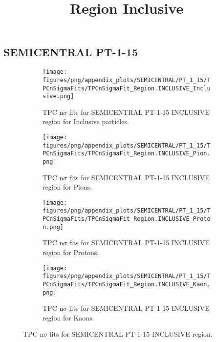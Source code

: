             \subsection{SEMICENTRAL PT-1-15}
            \begin{figure}[H]
                \title{Region Inclusive}
                \begin{subfigure}[b]{0.5\textwidth}
                    \centering
                    \texttt{[image: figures/png/appendix\_plots/SEMICENTRAL/PT\_1\_15/TPCnSigmaFits/TPCnSigmaFit\_Region.INCLUSIVE\_Inclusive.png]}
                    \caption{TPC n$\sigma$ fits for SEMICENTRAL PT-1-15 INCLUSIVE region for Inclusive particles.}
                    \label{fig:appendix_SEMICENTRAL_PT-1-15_INCLUSIVE_Inclusive}
                \end{subfigure}
                \begin{subfigure}[b]{0.5\textwidth}
                    \centering
                    \texttt{[image: figures/png/appendix\_plots/SEMICENTRAL/PT\_1\_15/TPCnSigmaFits/TPCnSigmaFit\_Region.INCLUSIVE\_Pion.png]}
                    \caption{TPC n$\sigma$ fits for SEMICENTRAL PT-1-15 INCLUSIVE region for Pions.}
                    \label{fig:appendix_SEMICENTRAL_PT-1-15_INCLUSIVE_Pion}
                \end{subfigure}
                \begin{subfigure}[b]{0.5\textwidth}
                    \centering
                    \texttt{[image: figures/png/appendix\_plots/SEMICENTRAL/PT\_1\_15/TPCnSigmaFits/TPCnSigmaFit\_Region.INCLUSIVE\_Proton.png]}
                    \caption{TPC n$\sigma$ fits for SEMICENTRAL PT-1-15 INCLUSIVE region for Protons.}
                    \label{fig:appendix_SEMICENTRAL_PT-1-15_INCLUSIVE_Proton}
                \end{subfigure}
                \begin{subfigure}[b]{0.5\textwidth}
                    \centering
                    \texttt{[image: figures/png/appendix\_plots/SEMICENTRAL/PT\_1\_15/TPCnSigmaFits/TPCnSigmaFit\_Region.INCLUSIVE\_Kaon.png]}
                    \caption{TPC n$\sigma$ fits for SEMICENTRAL PT-1-15 INCLUSIVE region for Kaons.}
                    \label{fig:appendix_SEMICENTRAL_PT-1-15_INCLUSIVE_Kaon}
                \end{subfigure}
                \caption{TPC n$\sigma$ fits for SEMICENTRAL PT-1-15 INCLUSIVE region.}
                \label{fig:appendix_SEMICENTRAL_PT-1-15_INCLUSIVE}
            \end{figure}

